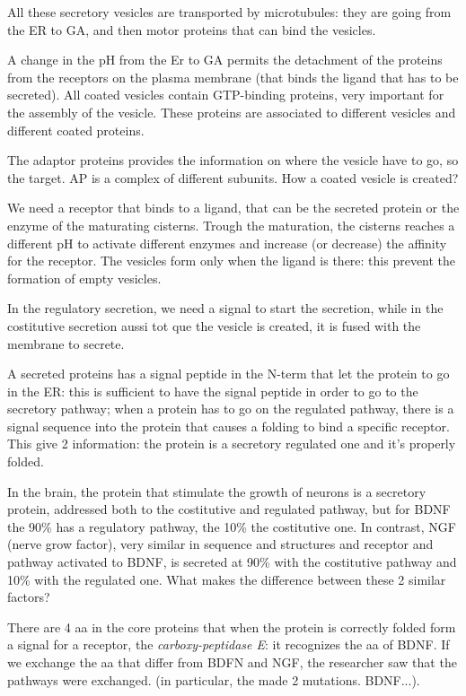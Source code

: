 \documentclass[a4paper, 12pt]{book}
\begin{document}
All these secretory vesicles are transported by microtubules: they are going from the ER to GA, and then motor proteins that can bind the vesicles.

A change in the pH from the Er to GA permits the detachment of the proteins from the receptors on the plasma membrane (that binds the ligand that has to be secreted). All coated vesicles contain GTP-binding proteins, very important for the assembly of the vesicle. These proteins are associated to different vesicles and different coated proteins.

The adaptor proteins provides the information on where the vesicle have to go, so the target. AP is a complex of different subunits. How a coated vesicle is created?

We need a receptor that binds to a ligand, that can be the secreted protein or the enzyme of the maturating cisterns. Trough the maturation, the cisterns reaches a different pH to activate different enzymes and increase (or decrease) the affinity for the receptor. The vesicles form only when the ligand is there: this prevent the formation of empty vesicles. 

In the regulatory secretion, we need a signal to start the secretion, while in the costitutive secretion aussi tot que the vesicle is created, it is fused with the membrane to secrete.

A secreted proteins has a signal peptide in the N-term that let the protein to go in the ER: this is sufficient to have the signal peptide in order to go to the secretory pathway; when a protein has to go on the regulated pathway, there is a signal sequence into the protein that causes a folding to bind a specific receptor. This give 2 information: the protein is a secretory regulated one and it's properly folded.

In the brain, the protein that stimulate the growth of neurons is a secretory protein, addressed both to the costitutive and regulated pathway, but for BDNF the 90\% has a regulatory pathway, the 10\% the costitutive one. In contrast, NGF (nerve grow factor), very similar in sequence and structures and receptor and pathway activated to BDNF, is secreted at 90\% with the costitutive pathway and 10\% with the regulated one. What makes the difference between these 2 similar factors?

There are 4 aa in the core proteins that when the protein is correctly folded form a signal for a receptor, the \emph{carboxy-peptidase E}: it recognizes the aa of BDNF. If we exchange the aa that differ from BDFN and NGF, the researcher saw that the pathways were exchanged. (in particular, the made 2 mutations. BDNF...).
\end{document}
